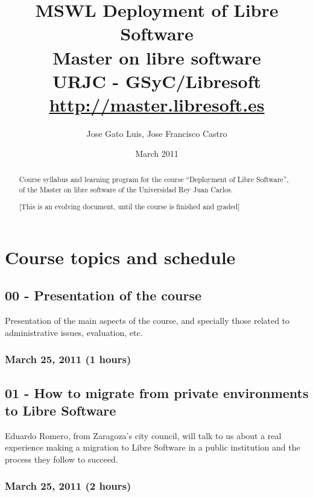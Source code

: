 \documentclass[a4paper]{article}
\title{MSWL Deployment of Libre Software \\
Master on libre software \\
URJC - GSyC/Libresoft \\
\url{http://master.libresoft.es}}
\author{Jose Gato Luis, Jose Francisco Castro}
\date{March 2011}
\begin{document}
\maketitle

\begin{abstract}
Course syllabus and learning program for the course ``Deployment of Libre Software'', of the Master on libre software of the
Universidad Rey Juan Carlos.

[This is an evolving document, until the course is finished and graded]
\end{abstract}

\tableofcontents

\section{Course topics and schedule}

\subsection{00 - Presentation of the course}

Presentation of the main aspects of the course, and specially those
related to administrative issues, evaluation, etc.

\subsubsection{March 25, 2011 (1 hours)}

\subsection{01 - How to migrate from private environments to Libre Software}

Eduardo Romero, from Zaragoza's city council, will talk to us about a real experience making a migration to Libre Software in a public institution and the process they follow to succeed. 

\subsubsection{March 25, 2011 (2 hours)}
\end{document}
